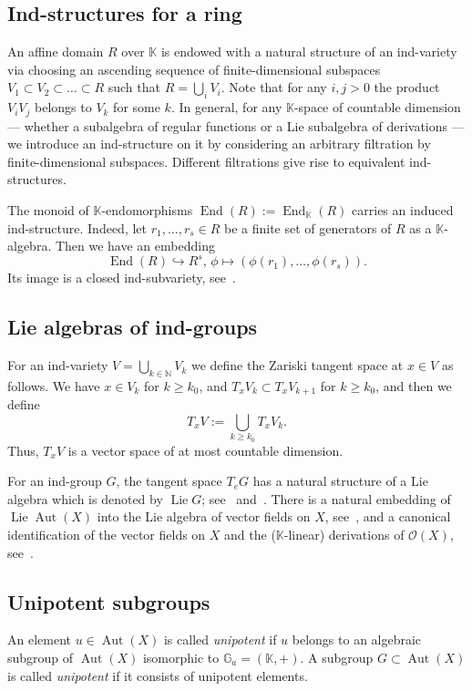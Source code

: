 \documentclass[12pt,a4paper]{amsart}
\theoremstyle{plain}
\theoremstyle{definition}
\theoremstyle{remark}
\def\Aut{\operatorname{Aut}}
\def\End{\operatorname{End}}
\def\Lie{\operatorname{Lie}}
\def\K{{\mathbb K}}
\def\cO{{\mathcal O}}
\def\embed{\hookrightarrow}
\begin{document}
\subsection{Ind-structures for a ring}\label{sec:ind-ring}
An affine domain $R$ over $\K$ is endowed with a natural structure of an ind-variety via choosing an ascending sequence of finite-dimensional subspaces $V_1\subset V_2\subset\ldots\subset R$ such that $R=\bigcup_i V_i$. Note that for any $i,j>0$ the product $V_i V_j$ belongs to $V_k$ for some $k$.
In general, for any $\K$-space of countable dimension --- whether a subalgebra of regular functions or a Lie subalgebra of derivations --- we introduce an ind-structure on it by considering an arbitrary filtration by finite-dimensional subspaces.
Different filtrations give rise to equivalent ind-structures. 

The monoid of $\K$-endomorphisms $\End(R):=\End_\K(R)$ carries an induced ind-structure.
Indeed, let $r_1,\ldots,r_s\in R$ be a finite set of generators of $R$ as a $\K$-algebra. Then we have an embedding 
\[\End(R)\embed R^s,\, \phi\mapsto (\phi(r_1),\ldots,\phi(r_s)).\]
Its image is a closed ind-subvariety, see~\cite[Proposition~13.1.2]{FK}.

\subsection{Lie algebras of ind-groups}
For an ind-variety $V = \bigcup_{k \in \mathbb{N}} V_k$ we define the Zariski tangent space at $x \in V$ as follows. We have $x \in V_k$ for $k \ge k_0$, and
$T_x V_k \subset T_x V_{k+1}$ for $k \ge k_0$, and then we define
\[
  T_x V := \bigcup_{k \ge k_0} T_x V_k.
\]
Thus, $T_x V$ is a vector space of at most countable dimension. 

For an ind-group $G$, the tangent space $T_e G$ has a natural structure of a Lie algebra which is denoted by $\Lie G$; see~\cite[Section~4]{Ku} and~\cite[Section~2]{FK}. 
There is a natural embedding of $\Lie\Aut(X)$ into the Lie algebra of vector fields on $X$, see~\cite[Proposition~7.2.4]{FK}, and a canonical identification of the vector fields on $X$ and the ($\K$-linear) derivations of $\cO(X)$, see~\cite[Section~3.2]{FK}.
 
\subsection{Unipotent subgroups}
 An element $u\in\Aut(X)$ is called \emph{unipotent} if $u$ 
 belongs to an algebraic subgroup of $\Aut(X)$ isomorphic to $\mathbb{G}_a=(\K,+)$. A subgroup $G\subset\Aut(X)$ is called \emph{unipotent} if it consists of unipotent elements. 
\end{document}
